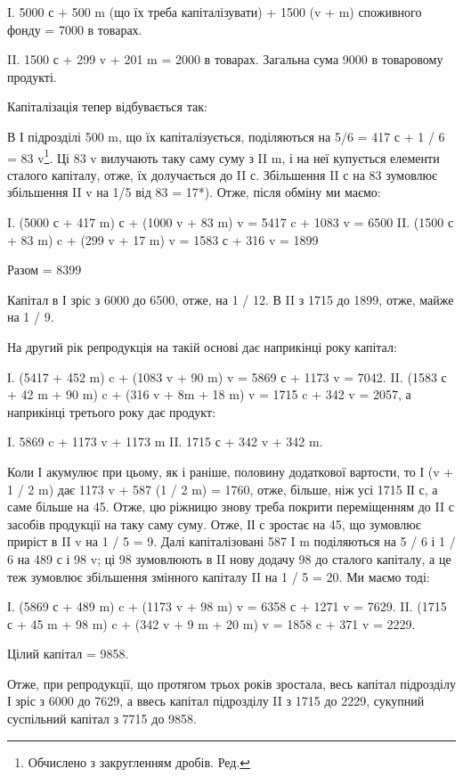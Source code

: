 I.  5000 с + 500 m (що їх треба капіталізувати) + 1500 (v + m) споживного
фонду = 7000 в товарах.

II.    1500 с + 299 v + 201 m = 2000 в товарах. Загальна сума 9000 в
товаровому продукті.

Капіталізація тепер відбувається так:

В І підрозділі 500 m, що їх капіталізується, поділяються на 5/6 =
417 с + 1 / 6 = 83 v\footnote*{
Обчислено з закругленням дробів. Ред.
}. Ці 83 v вилучають таку саму суму з II m, і на
неї купується елементи сталого капіталу, отже, їх долучається до II с.
Збільшення II с на 83 зумовлює збільшення II v на 1/5 від 83 = 17*).
Отже, після обміну ми маємо:

I. (5000 с + 417 m) с + (1000 v + 83 m) v = 5417 c + 1083 v = 6500
II. (1500 с + 83 m) c + (299 v + 17 m) v = 1583 с + 316 v = 1899

Разом = 8399

Капітал в І зріс з 6000 до 6500, отже, на 1 / 12. В II з 1715 до 1899,
отже, майже на 1 / 9.

На другий рік репродукція на такій основі дає наприкінці року
капітал:

І. (5417 + 452 m) c + (1083 v + 90 m) v = 5869 с + 1173 v = 7042.
II. (1583 с + 42 m + 90 m) c + (316 v + 8m + 18 m) v = 1715 c + 342 v =
2057,
а наприкінці третього року дає продукт:

I. 5869 c + 1173 v + 1173 m
II. 1715 с + 342 v + 342 m.

Коли І акумулює при цьому, як і раніше, половину додаткової вартости,
то І (v + 1 / 2 m) дає 1173 v + 587 (1 / 2 m) = 1760, отже, більше,
ніж усі 1715 ІІ с, а саме більше на 45. Отже, цю ріжницю знову треба
покрити переміщенням до II с засобів продукції на таку саму суму. Отже,
ІІ с зростає на 45, що зумовлює приріст в II v на 1 / 5 = 9. Далі капіталізовані
587 I m поділяються на 5 / 6 і 1 / 6 на 489 с і 98 v; ці 98 зумовлюють
в II нову додачу 98 до сталого капіталу, а це теж зумовлює
збільшення змінного капіталу II на 1 / 5 = 20. Ми маємо тоді:

І. (5869 с + 489 m) c + (1173 v + 98 m) v = 6358 с + 1271 v = 7629.
II. (1715 с + 45 m + 98 m) c + (342 v + 9 m + 20 m) v = 1858 c + 371 v = 2229.

Цілий капітал = 9858.

Отже, при репродукції, що протягом трьох років зростала,
весь капітал підрозділу І зріс з 6000 до 7629, а ввесь капітал підрозділу
II з 1715 до 2229, сукупний суспільний капітал з 7715 до 9858.